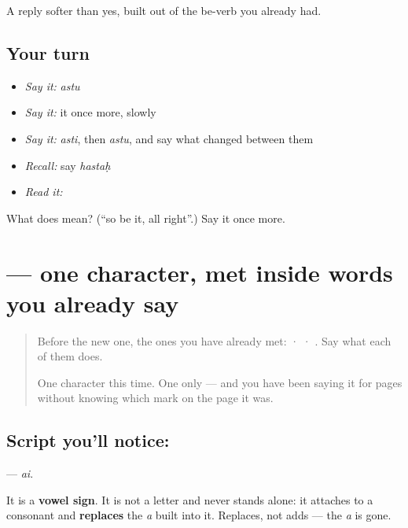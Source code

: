 \begin{grammarlens}[title={What you've built}]
A reply softer than yes, built out of the be-verb you already had.
\end{grammarlens}

\subsection*{Your turn}
\begin{itemize}
\raggedright
  \item \emph{Say it:} \emph{astu}
  \item \emph{Say it:} it once more, slowly
  \item \emph{Say it:} \emph{asti}, then \emph{astu}, and say what changed between them
  \item \emph{Recall:} say \emph{hastaḥ}
  \item \emph{Read it:} \textbf{}
\end{itemize}

\begin{tcolorbox}[breakable,colback=teal!4,colframe=teal!35!black,title={Before you move on}]
What does  mean? (\textquotedblleft{}so be it, all right\textquotedblright{}.) Say it once more.
\end{tcolorbox}
\section[\texorpdfstring{\sk{ै} (ai)}{ै (ai)}]{ — one character, met inside words you already say}

\label{lesson:SA-S223-vowel-sign-ai}



\begin{quote}
Before the new one, the ones you have already met:  ·  · . Say what each of them does.

One character this time. One only — and you have been saying it for pages without knowing which mark on the page it was.
\end{quote}

\subsection*{Script you'll notice: }
\textbf{} — \emph{ai}.

It is a \textbf{vowel sign}. It is not a letter and never stands alone: it attaches to a consonant and \textbf{replaces} the \emph{a} built into it. Replaces, not adds — the \emph{a} is gone.

